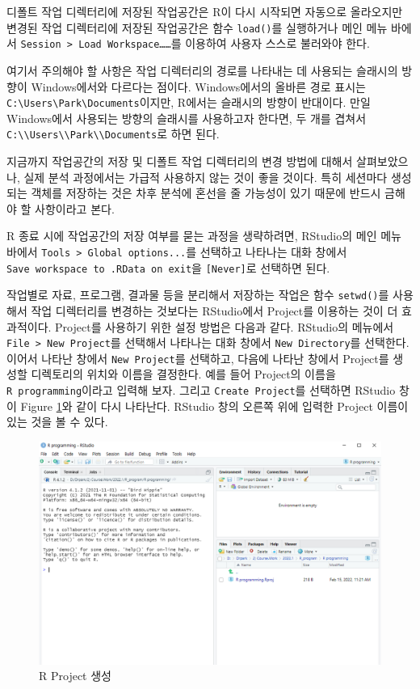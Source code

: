 \documentclass[
]{book}
\begin{document}
디폴트 작업 디렉터리에 저장된 작업공간은 R이 다시 시작되면 자동으로
올라오지만 변경된 작업 디렉터리에 저장된 작업공간은 함수 \texttt{load()}를
실행하거나 메인 메뉴 바에서 \texttt{Session\ \textgreater{}\ Load\ Workspace……}를 이용하여
사용자 스스로 불러와야 한다.

여기서 주의해야 할 사항은 작업 디렉터리의 경로를 나타내는 데 사용되는
슬래시의 방향이 Windows에서와 다르다는 점이다. Windows에서의 올바른 경로
표시는 \texttt{C:\textbackslash{}Users\textbackslash{}Park\textbackslash{}Documents}이지만, R에서는 슬래시의 방향이 반대이다.
만일 Windows에서 사용되는 방향의 슬래시를 사용하고자 한다면, 두 개를
겹쳐서 \texttt{C:\textbackslash{}\textbackslash{}Users\textbackslash{}\textbackslash{}Park\textbackslash{}\textbackslash{}Documents}로 하면 된다.

지금까지 작업공간의 저장 및 디폴트 작업 디렉터리의 변경 방법에 대해서
살펴보았으나, 실제 분석 과정에서는 가급적 사용하지 않는 것이 좋을
것이다. 특히 세션마다 생성되는 객체를 저장하는 것은 차후 분석에 혼선을
줄 가능성이 있기 때문에 반드시 금해야 할 사항이라고 본다.

R 종료 시에 작업공간의 저장 여부를 묻는 과정을 생략하려면, RStudio의 메인 메뉴
바에서 \texttt{Tools\ \textgreater{}\ Global\ options...}를 선택하고 나타나는 대화 창에서
\texttt{Save\ workspace\ to\ .RData\ on\ exit}을 \texttt{{[}Never{]}}로 선택하면 된다.

작업별로 자료, 프로그램, 결과물 등을 분리해서 저장하는 작업은 함수 \texttt{setwd()}를 사용해서
작업 디렉터리를 변경하는 것보다는 RStudio에서 Project를 이용하는 것이 더 효과적이다.
Project를 사용하기 위한 설정 방법은 다음과 같다.
RStudio의 메뉴에서 \texttt{File\ \textgreater{}\ New\ Project}를 선택해서 나타나는 대화 창에서 \texttt{New\ Directory}를 선택한다.
이어서 나타난 창에서 \texttt{New\ Project}를 선택하고, 다음에 나타난 창에서 Project를 생성할 디렉토리의 위치와
이름을 결정한다. 예를 들어 Project의 이름을 \texttt{R\ programming}이라고 입력해 보자.
그리고 \texttt{Create\ Project}를 선택하면 RStudio 창이 Figure \ref{fig:R-project}와 같이 다시 나타난다.
RStudio 창의 오른쪽 위에 입력한 Project 이름이 있는 것을 볼 수 있다.

\begin{figure}
\includegraphics[width=14.4in]{Figure/R_project} \caption{R Project 생성}\label{fig:R-project}
\end{figure}
\end{document}
